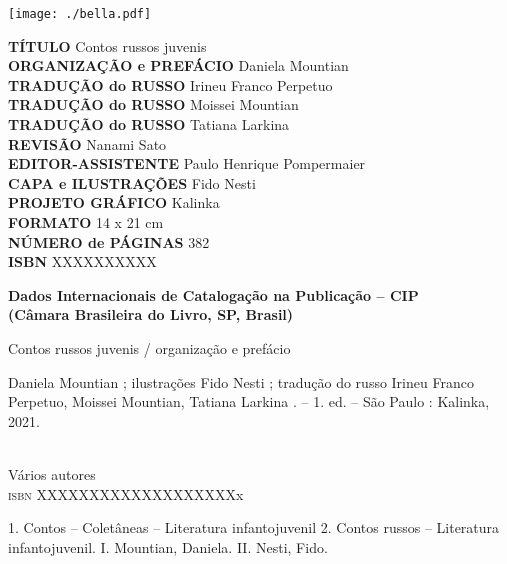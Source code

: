 \newcommand{\linha}[2]{\ifdef{#2}{\linhalayout{#1}{#2}}{}}

\begingroup\tiny
\parindent=0cm
\thispagestyle{empty}

\texttt{[image: ./bella.pdf]}

\textbf{TÍTULO} Contos russos juvenis\\
\textbf{ORGANIZAÇÃO e PREFÁCIO} Daniela Mountian\\
\textbf{TRADUÇÃO do RUSSO} Irineu Franco Perpetuo\\
\textbf{TRADUÇÃO do RUSSO} Moissei Mountian\\
\textbf{TRADUÇÃO do RUSSO} Tatiana Larkina\\
\textbf{REVISÃO} Nanami Sato\\
\textbf{EDITOR-ASSISTENTE} Paulo Henrique Pompermaier\\
\textbf{CAPA e ILUSTRAÇÕES} Fido Nesti\\
\textbf{PROJETO GRÁFICO} Kalinka\\
\textbf{FORMATO} 14 x 21 cm\\
\textbf{NÚMERO de PÁGINAS} 382\\
\textbf{ISBN} XXXXXXXXXX\\

\bigskip

\begin{flushleft}
\textbf{Dados Internacionais de Catalogação na Publicação -- CIP}\\
\textbf{(Câmara Brasileira do Livro, SP, Brasil)}\\
\hrulefill
\end{flushleft}
\hspace{5pt}Contos russos juvenis / organização e prefácio\\
\hspace{20pt}\parbox{185pt}{Daniela Mountian ; ilustrações Fido Nesti ; tradução do russo Irineu Franco Perpetuo, Moissei Mountian, Tatiana Larkina . -- 1. ed. -- São Paulo :
Kalinka, 2021.}\\[6pt]

\hspace{20pt}Vários autores\\
\hspace{20pt}\textsc{isbn} XXXXXXXXXXXXXXXXXXXx\\

\hspace{20pt}\parbox{185pt}{1. Contos -- Coletâneas -- Literatura infantojuvenil 2. Contos russos -- Literatura infantojuvenil. I. Mountian, Daniela. II. Nesti, Fido.}

